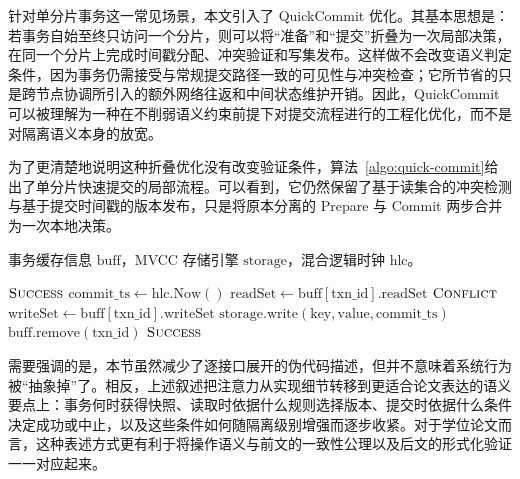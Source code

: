 针对单分片事务这一常见场景，本文引入了 QuickCommit 优化。其基本思想是：若事务自始至终只访问一个分片，则可以将“准备”和“提交”折叠为一次局部决策，在同一个分片上完成时间戳分配、冲突验证和写集发布。这样做不会改变语义判定条件，因为事务仍需接受与常规提交路径一致的可见性与冲突检查；它所节省的只是跨节点协调所引入的额外网络往返和中间状态维护开销。因此，QuickCommit 可以被理解为一种在不削弱语义约束前提下对提交流程进行的工程化优化，而不是对隔离语义本身的放宽。

为了更清楚地说明这种折叠优化没有改变验证条件，算法~\ref{algo:quick-commit}给出了单分片快速提交的局部流程。可以看到，它仍然保留了基于读集合的冲突检测与基于提交时间戳的版本发布，只是将原本分离的 Prepare 与 Commit 两步合并为一次本地决策。

\begin{algorithm}[htbp]
  \newcommand{\buff}{$\text{buff}$}
  \newcommand{\storage}{$\text{storage}$}
  \newcommand{\hlc}{$\text{hlc}$}
  \caption{QuickCommit 快速提交优化}
  \label{algo:quick-commit}
  \begin{algorithmic}[1]
    \Require 事务缓存信息 \buff，MVCC 存储引擎 \storage，混合逻辑时钟 \hlc。

    \State \Return $\textsc{Success}$ 
    \EndIf
    \State $\text{commit\_ts} \gets \text{hlc}.\text{Now}()$ 
    \State $\text{readSet} \gets \text{buff}[\text{txn\_id}].\text{readSet}$
    \State {}
    \State \Return $\textsc{Conflict}$
    \EndIf
    \EndFor
    \State $\text{writeSet} \gets \text{buff}[\text{txn\_id}].\text{writeSet}$
    \State $\text{storage}.\text{write}(\text{key}, \text{value}, \text{commit\_ts})$
    \EndFor
    \State $\text{buff}.\text{remove}(\text{txn\_id})$ 
    \State \Return $\textsc{Success}$
    \EndProcedure
  \end{algorithmic}
\end{algorithm}

需要强调的是，本节虽然减少了逐接口展开的伪代码描述，但并不意味着系统行为被“抽象掉”了。相反，上述叙述把注意力从实现细节转移到更适合论文表达的语义要点上：事务何时获得快照、读取时依据什么规则选择版本、提交时依据什么条件决定成功或中止，以及这些条件如何随隔离级别增强而逐步收紧。对于学位论文而言，这种表述方式更有利于将操作语义与前文的一致性公理以及后文的形式化验证一一对应起来。

